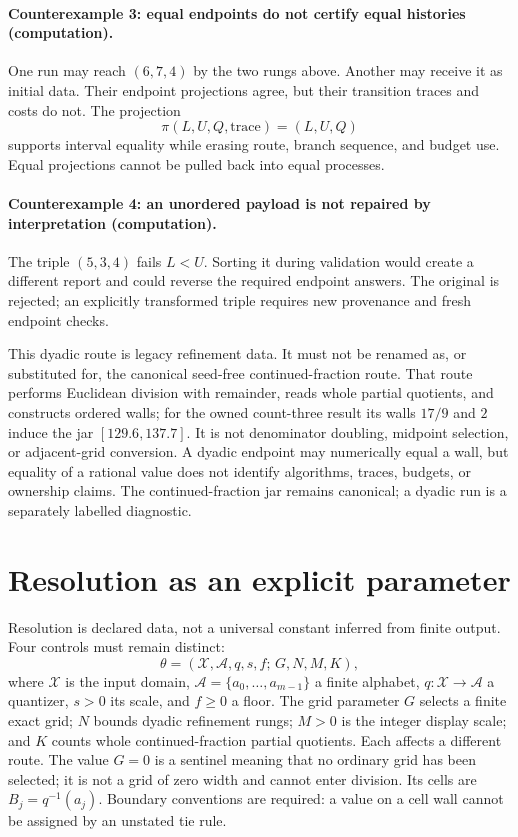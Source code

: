 \paragraph{Counterexample 3: equal endpoints do not certify equal histories (computation).}
One run may reach \((6,7,4)\) by the two rungs above.  Another may receive it as initial data.  Their endpoint
projections agree, but their transition traces and costs do not.  The projection
\[
                    \pi(L,U,Q,\text{trace})=(L,U,Q)
\]
supports interval equality while erasing route, branch sequence, and budget use.  Equal projections cannot be pulled
back into equal processes.

\paragraph{Counterexample 4: an unordered payload is not repaired by interpretation (computation).}
The triple \((5,3,4)\) fails \(L<U\).  Sorting it during validation would create a different report and could reverse
the required endpoint answers.  The original is rejected; an explicitly transformed triple requires new provenance
and fresh endpoint checks.

This dyadic route is legacy refinement data.  It must not be renamed as, or substituted for, the canonical seed-free
continued-fraction route.  That route performs Euclidean division with remainder, reads whole partial quotients, and
constructs ordered walls; for the owned count-three result its walls \(17/9\) and \(2\) induce the jar
\([129.6,137.7]\).  It is not denominator doubling, midpoint selection, or adjacent-grid conversion.  A dyadic endpoint
may numerically equal a wall, but equality of a rational value does not identify algorithms, traces, budgets, or
ownership claims.  The continued-fraction jar remains canonical; a dyadic run is a separately labelled diagnostic.

\section{Resolution as an explicit parameter}

Resolution is declared data, not a universal constant inferred from finite output.  Four controls must remain distinct:
\[
 \theta=(\mathcal X,\mathcal A,q,s,f;\,G,N,M,K),
\]
where \(\mathcal X\) is the input domain, \(\mathcal A=\{a_0,\ldots,a_{m-1}\}\) a finite alphabet,
\(q:\mathcal X\to\mathcal A\) a quantizer, \(s>0\) its scale, and \(f\geq0\) a floor.  The grid parameter \(G\)
selects a finite exact grid; \(N\) bounds dyadic refinement rungs; \(M>0\) is the integer display scale; and \(K\)
counts whole continued-fraction partial quotients.  Each affects a different route.  The value \(G=0\) is a sentinel
meaning that no ordinary grid has been selected; it is not a grid of zero width and cannot enter division.
Its cells are \(B_j=q^{-1}(a_j)\).  Boundary conventions are required: a value on a cell wall cannot be assigned by an
unstated tie rule.

